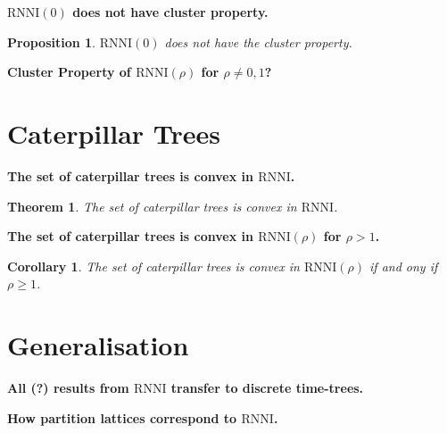 \documentclass[11pt]{amsart}
\newtheorem{proposition}{Proposition}
\newtheorem{theorem}{Theorem}
\newtheorem{corollary}{Corollary}
\newcommand{\rnni}{\mathrm{RNNI}}
\newcommand{\summary}[1]{\textbf{#1}} %
\begin{document}
\summary{$\rnni(0)$ does not have cluster property.}
\begin{proposition}
	$\rnni(0)$ does not have the cluster property.
\end{proposition}

\summary{Cluster Property of $\rnni(\rho)$ for $\rho \neq 0, 1$?}


\section{Caterpillar Trees}

\summary{The set of caterpillar trees is convex in $\rnni$.}
\begin{theorem}
	The set of caterpillar trees is convex in $\rnni$.
\end{theorem}

\summary{The set of caterpillar trees is convex in $\rnni(\rho)$ for $\rho > 1$.}
\begin{corollary}
	The set of caterpillar trees is convex in $\rnni(\rho)$ if and ony if $\rho \geq 1$.
\end{corollary}


\section{Generalisation}

\summary{All (?) results from $\rnni$ transfer to discrete time-trees.}

\summary{How partition lattices correspond to $\rnni$.}
\end{document}
